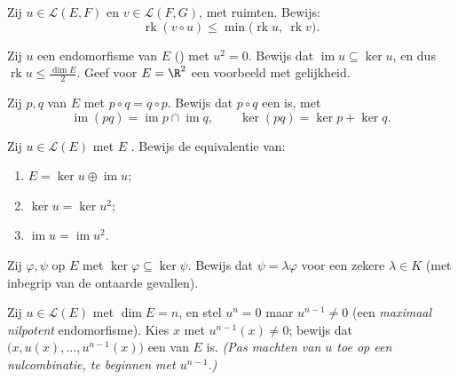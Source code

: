 \begin{exercise}[$\star$]\label{exo:b1:linmaps:4}
Zij $u \in \mathcal{L}(E, F)$ en $v \in \mathcal{L}(F, G)$, met
 ruimten. Bewijs:
\[
\operatorname{rk}(v \circ u) \leq
\min\bigl(\operatorname{rk} u,\ \operatorname{rk} v\bigr).
\]
\end{exercise}

\begin{exercise}[$\star\star$]\label{exo:b1:linmaps:5}
Zij $u$ een endomorfisme van $E$ () met $u^2 =
0$. Bewijs dat $\operatorname{im} u \subseteq \ker u$, en dus
$\operatorname{rk} u \leq \frac{\dim E}{2}$. Geef voor $E = \R^2$
een voorbeeld met gelijkheid.
\end{exercise}

\begin{exercise}[$\star\star$]\label{exo:b1:linmaps:6}
Zij $p, q$  van $E$ met $p \circ q = q \circ p$. Bewijs
dat $p \circ q$ een  is, met
\[
\operatorname{im}(pq) = \operatorname{im} p \cap \operatorname{im}
q ,
\qquad
\ker (pq) = \ker p + \ker q .
\]
\end{exercise}

\begin{exercise}[$\star\star$]\label{exo:b1:linmaps:7}
Zij $u \in \mathcal{L}(E)$ met $E$ . Bewijs de
equivalentie van:
\begin{enumerate}
  \item $E = \ker u \oplus \operatorname{im} u$;
  \item $\ker u = \ker u^2$;
  \item $\operatorname{im} u = \operatorname{im} u^2$.
\end{enumerate}
\end{exercise}

\begin{exercise}[$\star\star$]\label{exo:b1:linmaps:8}
Zij $\varphi, \psi$  op $E$ met $\ker\varphi
\subseteq \ker\psi$. Bewijs dat $\psi = \lambda\varphi$ voor een
zekere $\lambda \in K$ (met inbegrip van de ontaarde gevallen).
\end{exercise}

\begin{exercise}[$\star\star\star$]\label{exo:b1:linmaps:9}
Zij $u \in \mathcal{L}(E)$ met $\dim E = n$, en stel $u^n = 0$ maar
$u^{n-1} \neq 0$ (een \emph{maximaal nilpotent} endomorfisme). Kies
$x$ met $u^{n-1}(x) \neq 0$; bewijs dat $\bigl(x, u(x), \dots,
u^{n-1}(x)\bigr)$ een  van $E$ is. \emph{(Pas machten van $u$
toe op een nulcombinatie, te beginnen met $u^{n-1}$.)}
\end{exercise}

